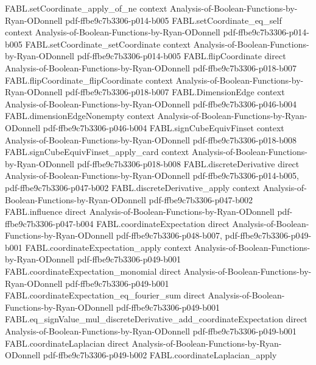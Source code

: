 \begin{theorem}
\proofstep
  {FABL.setCoordinate_apply_of_ne}
  {context}
  {Analysis-of-Boolean-Functions-by-Ryan-ODonnell}
  {pdf-ffbe9c7b3306-p014-b005}
\proofstep
  {FABL.setCoordinate_eq_self}
  {context}
  {Analysis-of-Boolean-Functions-by-Ryan-ODonnell}
  {pdf-ffbe9c7b3306-p014-b005}
\proofstep
  {FABL.setCoordinate_setCoordinate}
  {context}
  {Analysis-of-Boolean-Functions-by-Ryan-ODonnell}
  {pdf-ffbe9c7b3306-p014-b005}
\proofstep
  {FABL.flipCoordinate}
  {direct}
  {Analysis-of-Boolean-Functions-by-Ryan-ODonnell}
  {pdf-ffbe9c7b3306-p018-b007}
\proofstep
  {FABL.flipCoordinate_flipCoordinate}
  {context}
  {Analysis-of-Boolean-Functions-by-Ryan-ODonnell}
  {pdf-ffbe9c7b3306-p018-b007}
\proofstep
  {FABL.DimensionEdge}
  {context}
  {Analysis-of-Boolean-Functions-by-Ryan-ODonnell}
  {pdf-ffbe9c7b3306-p046-b004}
\proofstep
  {FABL.dimensionEdgeNonempty}
  {context}
  {Analysis-of-Boolean-Functions-by-Ryan-ODonnell}
  {pdf-ffbe9c7b3306-p046-b004}
\proofstep
  {FABL.signCubeEquivFinset}
  {context}
  {Analysis-of-Boolean-Functions-by-Ryan-ODonnell}
  {pdf-ffbe9c7b3306-p018-b008}
\proofstep
  {FABL.signCubeEquivFinset_apply_card}
  {context}
  {Analysis-of-Boolean-Functions-by-Ryan-ODonnell}
  {pdf-ffbe9c7b3306-p018-b008}
\proofstep
  {FABL.discreteDerivative}
  {direct}
  {Analysis-of-Boolean-Functions-by-Ryan-ODonnell}
  {pdf-ffbe9c7b3306-p014-b005,
    pdf-ffbe9c7b3306-p047-b002}
\proofstep
  {FABL.discreteDerivative_apply}
  {context}
  {Analysis-of-Boolean-Functions-by-Ryan-ODonnell}
  {pdf-ffbe9c7b3306-p047-b002}
\proofstep
  {FABL.influence}
  {direct}
  {Analysis-of-Boolean-Functions-by-Ryan-ODonnell}
  {pdf-ffbe9c7b3306-p047-b004}
\proofstep
  {FABL.coordinateExpectation}
  {direct}
  {Analysis-of-Boolean-Functions-by-Ryan-ODonnell}
  {pdf-ffbe9c7b3306-p048-b007,
    pdf-ffbe9c7b3306-p049-b001}
\proofstep
  {FABL.coordinateExpectation_apply}
  {context}
  {Analysis-of-Boolean-Functions-by-Ryan-ODonnell}
  {pdf-ffbe9c7b3306-p049-b001}
\proofstep
  {FABL.coordinateExpectation_monomial}
  {direct}
  {Analysis-of-Boolean-Functions-by-Ryan-ODonnell}
  {pdf-ffbe9c7b3306-p049-b001}
\proofstep
  {FABL.coordinateExpectation_eq_fourier_sum}
  {direct}
  {Analysis-of-Boolean-Functions-by-Ryan-ODonnell}
  {pdf-ffbe9c7b3306-p049-b001}
\proofstep
  {FABL.eq_signValue_mul_discreteDerivative_add_coordinateExpectation}
  {direct}
  {Analysis-of-Boolean-Functions-by-Ryan-ODonnell}
  {pdf-ffbe9c7b3306-p049-b001}
\proofstep
  {FABL.coordinateLaplacian}
  {direct}
  {Analysis-of-Boolean-Functions-by-Ryan-ODonnell}
  {pdf-ffbe9c7b3306-p049-b002}
\proofstep
  {FABL.coordinateLaplacian_apply}

\end{theorem}
